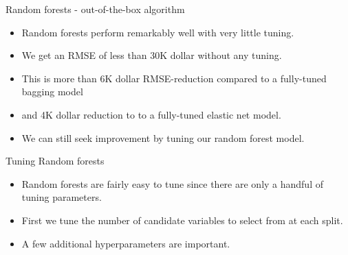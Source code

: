 \documentclass[
  10pt,
  ignorenonframetext,
]{beamer}
\providecommand{\tightlist}{%
  \setlength{\itemsep}{0pt}\setlength{\parskip}{0pt}}
\begin{document}
\begin{frame}{Random forests - out-of-the-box algorithm}
\protect\hypertarget{random-forests---out-of-the-box-algorithm}{}

\begin{itemize}
\tightlist
\item
  Random forests perform remarkably well with very little tuning.
\item
  We get an RMSE of less than 30K dollar without any tuning.
\item
  This is more than 6K dollar RMSE-reduction compared to a fully-tuned
  bagging model
\item
  and 4K dollar reduction to to a fully-tuned elastic net model.
\item
  We can still seek improvement by tuning our random forest model.
\end{itemize}

\begin{block}{Tuning Random forests}

\begin{itemize}
\tightlist
\item
  Random forests are fairly easy to tune since there are only a handful
  of tuning parameters.
\item
  First we tune the number of candidate variables to select from at each
  split.
\item
  A few additional hyperparameters are important.
\end{itemize}

\end{block}

\end{frame}
\end{document}
